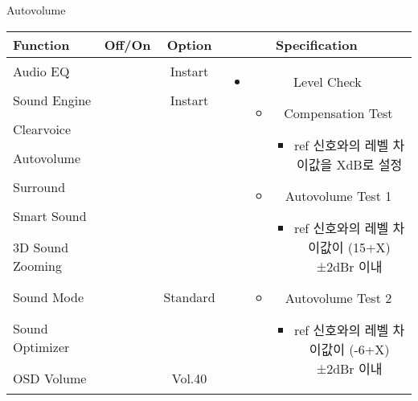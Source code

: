 \begin{frame}[t]{Autovolume}
\begin{tiny}
\begin{tabular}{@{}lccc@{}}
\toprule
Function & Off/On & Option & Specification \\
\midrule
Audio EQ & \color{black}{Off} & Instart &
\multirow{10}{60mm}{
\begin{itemize}
\item Level Check
	\begin{itemize}
	\item Compensation Test
		\begin{itemize}\tiny
		\item ref 신호와의 레벨 차이값을 XdB로 설정
		\end{itemize}
	\item Autovolume Test 1
		\begin{itemize}\tiny
		\item ref 신호와의 레벨 차이값이 (15+X)±2dBr 이내
		\end{itemize}
	\item Autovolume Test 2
		\begin{itemize}\tiny
		\item ref 신호와의 레벨 차이값이 (-6+X)±2dBr 이내
		\end{itemize}
	\end{itemize}
\end{itemize}
} \\
Sound Engine & \color{blue}{On} & Instart & \\
Clearvoice & \color{black}{Off} & & \\
Autovolume & \color{blue}{On} & & \\
Surround & \color{black}{Off} & & \\
Smart Sound & \color{black}{Off} & & \\
3D Sound Zooming & \color{black}{Off} & & \\
Sound Mode & \color{blue}{On} & Standard & \\
Sound Optimizer & \color{black}{Off} & & \\
OSD Volume & \color{blue}{On} & Vol.40 & \\
\midrule
\end{tabular}
\end{tiny}

\end{frame}

